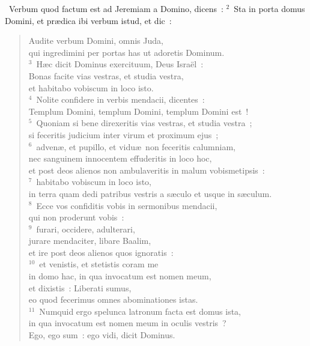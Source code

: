 ~\lettrine[lines=10,image=true,loversize=0.05,lraise=-0.03]{V}{}erbum quod factum est ad Jeremiam a Domino, dicens~:
${}^{2}$~Sta in porta domus Domini, et pr\ae dica ibi verbum istud, et dic~: \begin{flushleft}\begin{verse}Audite verbum Domini, omnis Juda,\\ qui ingredimini per portas has ut adoretis Dominum.\\
${}^{3}$~H\ae c dicit Dominus exercituum, Deus Isra\"el~:\\ Bonas facite vias vestras, et studia vestra,\\ et habitabo vobiscum in loco isto.\\
${}^{4}$~Nolite confidere in verbis mendacii, dicentes~:\\ Templum Domini, templum Domini, templum Domini est~!\\
${}^{5}$~Quoniam si bene direxeritis vias vestras, et studia vestra~;\\ si feceritis judicium inter virum et proximum ejus~;\\
${}^{6}$~adven\ae , et pupillo, et vidu\ae\ non feceritis calumniam,\\ nec sanguinem innocentem effuderitis in loco hoc,\\ et post deos alienos non ambulaveritis in malum vobismetipsis~:\\
${}^{7}$~habitabo vobiscum in loco isto,\\ in terra quam dedi patribus vestris a s\ae culo et usque in s\ae culum.\\
${}^{8}$~Ecce vos confiditis vobis in sermonibus mendacii,\\ qui non proderunt vobis~:\\
${}^{9}$~furari, occidere, adulterari,\\ jurare mendaciter, libare Baalim,\\ et ire post deos alienos quos ignoratis~:\\
${}^{10}$~et venistis, et stetistis coram me\\ in domo hac, in qua invocatum est nomen meum,\\ et dixistis~: Liberati sumus,\\ eo quod fecerimus omnes abominationes istas.\\
${}^{11}$~Numquid ergo spelunca latronum facta est domus ista,\\ in qua invocatum est nomen meum in oculis vestris~?\\ Ego, ego sum~: ego vidi, dicit Dominus.\\

\end{verse}
\end{flushleft}

